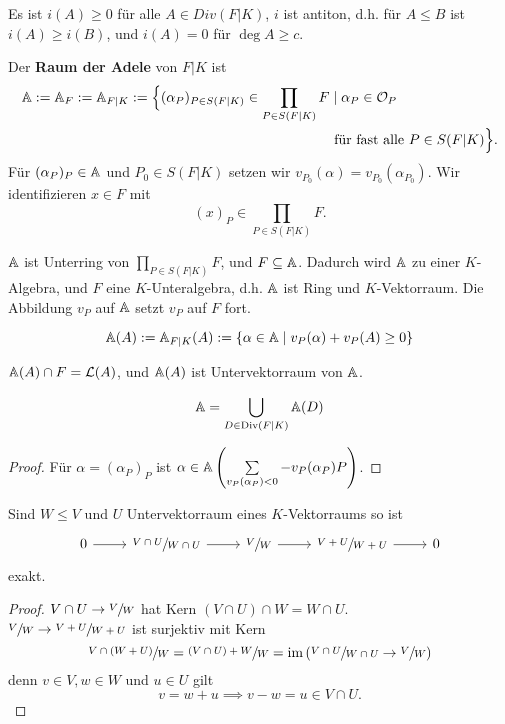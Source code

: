 \begin{bemerkungnr}
    Es ist $i(A) \geq 0$ für alle $A \in Div(F|K)$,
    $i$ ist antiton, d.h. für $A \leq B$ ist $i(A) \geq i(B)$, und
    $i(A) = 0$ für $\deg A \geq c$.
\end{bemerkungnr}

\begin{definition}
    Der \textbf{Raum der Adele} von $F|K$ ist
    \begin{align*} 
        \mathbb{A} := \mathbb{A}_F := \mathbb{A}_{F|K} := \Big\{(\alpha_P)_{P \in S(F|K)} \in \prod\limits_{P \in S(F|K)} F &\mid \alpha_P \in \mathcal{O}_P\\\
        &\text{ für fast alle } P \in S(F|K)\Big\}.
    \end{align*}
    Für $(\alpha_P)_P \in \mathbb{A}$ und $P_0 \in S(F|K)$ setzen wir $v_{P_0}(\alpha) = v_{P_0}(\alpha_{P_0})$.
    Wir identifizieren $x \in F$ mit $$(x)_P \in \prod\limits_{P \in S(F|K)} F.$$
\end{definition}

\begin{bemerkungnr}
    $\mathbb{A}$ ist Unterring von $\prod\limits_{P \in S(F|K)} F$, und $F \subseteq \mathbb{A}$.
    Dadurch wird $\mathbb{A}$ zu einer $K$-Algebra, und $F$ eine $K$-Unteralgebra, d.h.
    $\mathbb{A}$ ist Ring und $K$-Vektorraum.
    Die Abbildung $v_P$ auf $\mathbb{A}$ setzt $v_P$ auf $F$ fort.
\end{bemerkungnr}

\begin{definition}
    $$\mathbb{A}(A) := \mathbb{A}_{F|K}(A) := \{\alpha \in \mathbb{A} \mid v_P(\alpha) + v_P(A) \geq 0\}$$
\end{definition}

\begin{bemerkungnr}
    $\mathbb{A}(A) \cap F = \mathcal{L}(A)$, und $\mathbb{A}(A)$ ist Untervektorraum von $\mathbb{A}$.
\end{bemerkungnr}

\begin{lemma}
    $$ \mathbb{A} = \bigcup\limits_{D \in \operatorname{Div}(F|K)}\mathbb{A}(D) $$
\end{lemma}
\begin{proof}
    Für $\alpha = (\alpha_P)_P$ ist $\alpha \in \mathbb{A}\left(\sum\limits_{v_P(\alpha_P)<0}-v_P(\alpha_P)P\right)$.
\end{proof}

\begin{lemma}
    Sind $W \leq V$ und $U$ Untervektorraum eines $K$-Vektorraums so ist
    $$\begin{tikzcd}
        0 \ar[r] &\sfrac{V\cap U}{W \cap U} \ar[r] & \sfrac{V}{W} \ar[r] & \sfrac{V + U}{W +U} \ar[r] & 0
    \end{tikzcd}$$
    exakt.
\end{lemma}
\begin{proof}
    $ V \cap U \to \sfrac{V}{W}$ hat Kern $(V \cap U) \cap W = W \cap U$.\\
    $ \sfrac{V}{W} \to \sfrac{V+U}{W+U}$ ist surjektiv mit Kern 
    $$ \sfrac{V \cap (W+U)}{W} = \sfrac{(V \cap U) +W}{W} = \operatorname{im}\left(\sfrac{V \cap U}{W \cap U} \to \sfrac{V}{W}\right)$$
    denn $v \in V,w \in W$ und $u \in U$ gilt
    $$ v=w+u \implies v - w = u \in V \cap U.$$
\end{proof}

